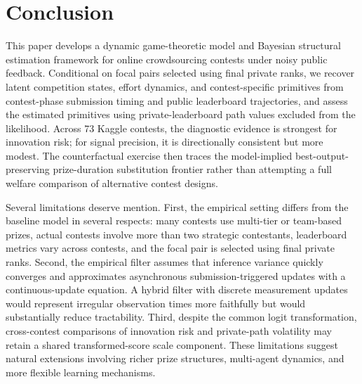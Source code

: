 \documentclass[mnsc]{informs3}
\begin{document}
\section{Conclusion}

This paper develops a dynamic game-theoretic model and Bayesian structural estimation framework for online crowdsourcing contests under noisy public feedback. Conditional on focal pairs selected using final private ranks, we recover latent competition states, effort dynamics, and contest-specific primitives from contest-phase submission timing and public leaderboard trajectories, and assess the estimated primitives using private-leaderboard path values excluded from the likelihood. Across 73 Kaggle contests, the diagnostic evidence is strongest for innovation risk; for signal precision, it is directionally consistent but more modest. The counterfactual exercise then traces the model-implied best-output-preserving prize-duration substitution frontier rather than attempting a full welfare comparison of alternative contest designs.


Several limitations deserve mention. First, the empirical setting differs from the baseline model in several respects: many contests use multi-tier or team-based prizes, actual contests involve more than two strategic contestants, leaderboard metrics vary across contests, and the focal pair is selected using final private ranks. Second, the empirical filter assumes that inference variance quickly converges and approximates asynchronous submission-triggered updates with a continuous-update equation. A hybrid filter with discrete measurement updates would represent irregular observation times more faithfully but would substantially reduce tractability. Third, despite the common logit transformation, cross-contest comparisons of innovation risk and private-path volatility may retain a shared transformed-score scale component. These limitations suggest natural extensions involving richer prize structures, multi-agent dynamics, and more flexible learning mechanisms.




%
%
%
\end{document}
